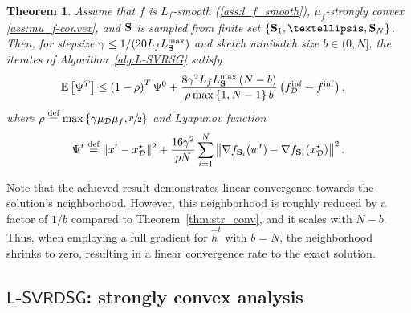 \documentclass{article}
\newcommand{\cD}{\mathcal{D}}
\newcommand{\eqdef}{\stackrel{\text{def}}{=}}
\newtheorem{theorem}{Theorem}
\theoremstyle{plain}
\newcommand{\tf}{f_{\mathcal{D}}}
\newcommand{\mS}{{\bf S}}
\theoremstyle{plain}
\theoremstyle{definition}
\theoremstyle{remark}
\begin{document}
\begin{theorem} \label{thm:str_cvx-vr}
Assume that $f$ is $L_f$-smooth (\ref{ass:l_f_smooth}), $\mu_f$-strongly convex \eqref{ass:mu_f-convex}, and $\mS$ is sampled from finite set $\{\mS_1,\ldots, \mS_{N}\}$.
Then, for stepsize $\gamma \leq 1/(20 L_f L_{\mS}^{\max})$ and sketch minibatch size $b \in (0, N]$, the iterates of Algorithm~\ref{alg:L-SVRSG} satisfy
\begin{equation*}
\begin{split}
	\mathbb{E} \left[\Psi^{T}\right]&\leq \left(1 - \rho \right)^T\Psi^0
    + \frac{8\gamma^2L_fL_{\mS}^{\max}\left(N - b\right) }{\rho  \max\left\lbrace  1, N - 1\right\rbrace b} \left(\tf^{\inf}- f^{\inf}\right),
\end{split}
\end{equation*}
where $\rho \eqdef \max\left\lbrace\gamma \mu_{\mathcal{D}} \mu_f, \sfrac{p}{2}\right\rbrace$ and Lyapunov function
$$\Psi^t \eqdef \|x^t - x_\cD^\star\|^2 + \frac{16 \gamma^2}{pN} \sum\limits^{N}_{i = 1}\left\|\nabla f_{\mS_i}(w^t) - \nabla f_{\mS_i}(x_\cD^\star)\right\|^2.$$
\end{theorem}
Note that the achieved result demonstrates linear convergence towards the solution's neighborhood. However, this neighborhood is roughly reduced by a factor of $1/b$ compared to Theorem~\ref{thm:str_conv}, and it scales with $N-b$. Thus, when employing a full gradient for $\hat{h}^t$ with $b=N$, the neighborhood shrinks to zero, resulting in a linear convergence rate to the exact solution.


\subsection{$\mathsf{L}$-$\mathsf{SVRDSG}$: strongly convex analysis}
\end{document}
